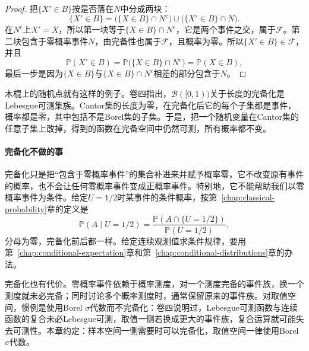 \begin{proof}
把$\{X'\in B\}$按是否落在$N$中分成两块：
\[
  \{X'\in B\}=\bigl(\{X\in B\}\cap N^{\mathrm{c}}\bigr)\cup\bigl(\{X'\in B\}\cap N\bigr).
\]
在$N^{\mathrm{c}}$上$X'=X$，所以第一块等于$\{X\in B\}\cap N^{\mathrm{c}}$，它是两个事件之交，属于$\mathcal{F}$。第二块包含于零概率事件$N$，由完备性也属于$\mathcal{F}$，且概率为零。所以$\{X'\in B\}\in\mathcal{F}$，并且
\[
  \mathbb{P}(X'\in B)=\mathbb{P}\bigl(\{X\in B\}\cap N^{\mathrm{c}}\bigr)=\mathbb{P}(X\in B),
\]
最后一步是因为$\{X\in B\}$与$\{X\in B\}\cap N^{\mathrm{c}}$相差的部分包含于$N$。
\end{proof}

木棍上的随机点就有这样的例子。卷四指出，$\mathcal{B}([0,1))$关于长度的完备化是Lebesgue可测集族。Cantor集的长度为零，在完备化后它的每个子集都是事件，概率都是零，其中包括不是Borel集的子集。于是，把一个随机变量在Cantor集的任意子集上改掉，得到的函数在完备空间中仍然可测，所有概率都不变。

\paragraph{完备化不做的事}
完备化只是把“包含于零概率事件”的集合补进来并赋予概率零，它不改变原有事件的概率，也不会让任何零概率事件变成正概率事件。特别地，它不能帮助我们以零概率事件为条件。给定$U=1/2$时某事件的条件概率，按第~\ref{chap:classical-probability}章的定义是
\[
  \mathbb{P}(A\mid U=1/2)=\frac{\mathbb{P}(A\cap\{U=1/2\})}{\mathbb{P}(U=1/2)},
\]
分母为零，完备化前后都一样。给定连续观测值求条件规律，要用第~\ref{chap:conditional-expectation}章和第~\ref{chap:conditional-distributions}章的办法。

完备化也有代价。零概率事件依赖于概率测度，对一个测度完备的事件族，换一个测度就未必完备；同时讨论多个概率测度时，通常保留原来的事件族。对取值空间，惯例是使用Borel $\sigma$代数而不完备化：卷四说明过，Lebesgue可测函数与连续函数的复合未必Lebesgue可测，取值一侧若换成更大的事件族，复合运算就可能失去可测性。本章约定：样本空间一侧需要时可以完备化，取值空间一律使用Borel $\sigma$代数。
